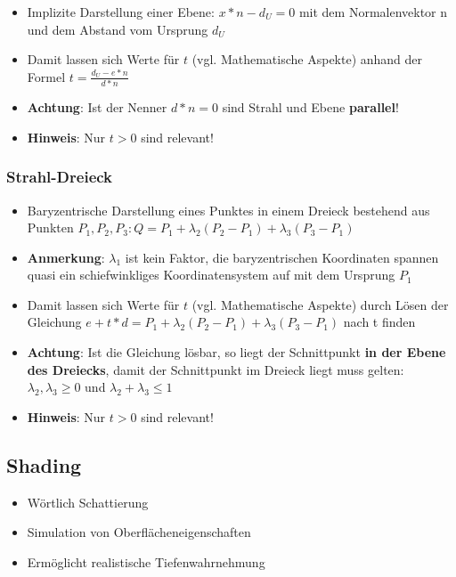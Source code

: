 \documentclass[10pt,a4paper]{article}
\begin{document}
	\begin{itemize}
		\item Implizite Darstellung einer Ebene: $x * n - d_U = 0$ mit dem Normalenvektor n und dem Abstand vom Ursprung $d_U$
		\item Damit lassen sich Werte für $t$ (vgl. Mathematische Aspekte) anhand der Formel $t = \frac{d_U - e * n}{d * n}$
		\item \textbf{Achtung}: Ist der Nenner $d * n = 0$ sind Strahl und Ebene \textbf{parallel}!
		\item \textbf{Hinweis}: Nur $t > 0$ sind relevant!
	\end{itemize}

	\subsubsection{Strahl-Dreieck}
	\label{rt:ssub:strahl_dreieck}
	
	\begin{itemize}
		\item Baryzentrische Darstellung eines Punktes in einem Dreieck bestehend aus Punkten $P_1, P_2, P_3: Q = P_1 + \lambda_2(P_2 - P_1) + \lambda_3(P_3 - P_1)$
		\item \textbf{Anmerkung}: $\lambda_1$ ist kein Faktor, die baryzentrischen Koordinaten spannen quasi ein schiefwinkliges Koordinatensystem auf mit dem Ursprung $P_1$
		\item Damit lassen sich Werte für $t$ (vgl. Mathematische Aspekte) durch Lösen der Gleichung $e + t * d = P_1 + \lambda_2(P_2 - P_1) + \lambda_3(P_3 - P_1)$ nach t finden
		\item \textbf{Achtung}: Ist die Gleichung lösbar, so liegt der Schnittpunkt \textbf{in der Ebene des Dreiecks}, damit der Schnittpunkt im Dreieck liegt muss gelten: $\lambda_2, \lambda_3 \geq 0$ und $\lambda_2 + \lambda_3 \leq 1$
		\item \textbf{Hinweis}: Nur $t > 0$ sind relevant!
	\end{itemize}

	\subsection{Shading}
	\label{rt:sub:shading}

	\begin{itemize}
		\item Wörtlich \glqq Schattierung\grqq
		\item Simulation von Oberflächeneigenschaften
		\item Ermöglicht realistische Tiefenwahrnehmung
	\end{itemize}
\end{document}
